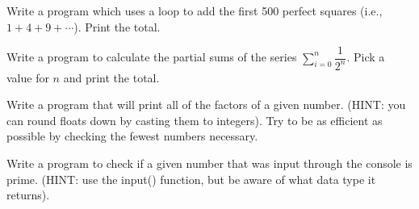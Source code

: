 \documentclass[12pt]{article}%
\begin{document}
\begin{Exercise}[origin={15 points}]

Write a program which uses a loop to add the first 500 perfect squares (i.e., $1+4+9+\cdots$). Print the total.

\end{Exercise}


\begin{Exercise}[origin={15 points}]

Write a program to calculate the partial sums of the series $\sum_{i=0}^{n} \dfrac{1}{2^n}$. Pick a value for $n$ and print the total.

\end{Exercise}


\begin{Exercise}[origin={15 points}]

Write a program that will print all of the factors of a given number. (HINT: you can round floats down by casting them to integers). Try to be as efficient as possible by checking the fewest numbers necessary.

\end{Exercise}


\begin{Exercise}[origin={15 points}]

Write a program to check if a given number that was input through the console is prime. (HINT: use the input() function, but be aware of what data type it returns).

\end{Exercise}
\end{document}
